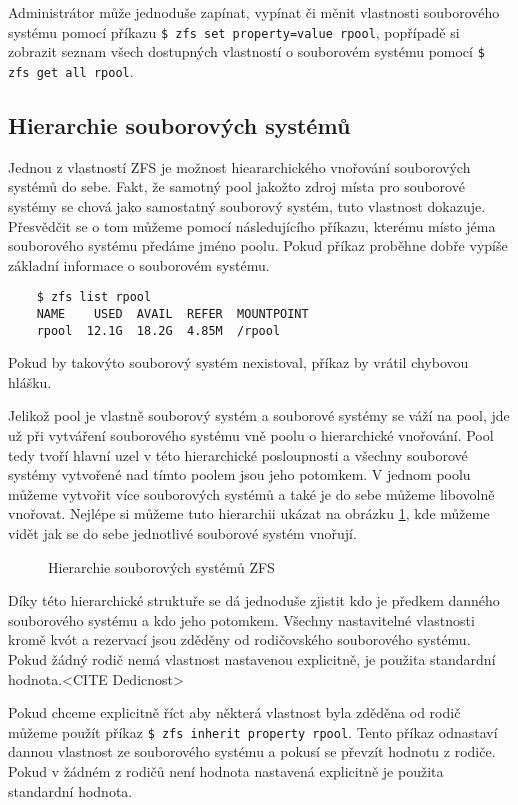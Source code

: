     Administrátor může jednoduše zapínat, vypínat či měnit vlastnosti souborového systému pomocí příkazu \verb|$ zfs set property=value rpool|, popřípadě si zobrazit seznam všech dostupných vlastností o souborovém systému pomocí \verb|$ zfs get all rpool|.

    \subsection{Hierarchie souborových systémů}
    \label{hiararchy}
    Jednou z vlastností ZFS je možnost hieararchického vnořování souborových systémů do sebe. Fakt, že samotný pool jakožto zdroj místa pro souborové systémy se chová jako samostatný souborový systém, tuto vlastnost dokazuje. Přesvědčit se o tom můžeme pomocí následujícího příkazu, kterému místo jéma souborového systému předáme jméno poolu. Pokud příkaz proběhne dobře vypíše základní informace o souborovém systému.
    \begin{verbatim}
    $ zfs list rpool
    NAME    USED  AVAIL  REFER  MOUNTPOINT
    rpool  12.1G  18.2G  4.85M  /rpool
    \end{verbatim}
    Pokud by takovýto souborový systém nexistoval, příkaz by vrátil chybovou hlášku.

    Jelikož pool je vlastně souborový systém a souborové systémy se váží na pool, jde už při vytváření souborového systému vně poolu o hierarchické vnořování. Pool tedy tvoří hlavní uzel v této hierarchické posloupnosti a všechny souborové systémy vytvořené nad tímto poolem jsou jeho potomkem. V jednom poolu můžeme vytvořit více souborových systémů a také je do sebe můžeme libovolně vnořovat. Nejlépe si můžeme tuto hierarchii ukázat na obrázku \ref{fshierarchy}, kde můžeme vidět jak se do sebe jednotlivé souborové systém vnořují.
    \begin{figure}[h]
        \caption{Hierarchie souborových systémů ZFS}
        \label{fshierarchy}
    \end{figure}

    Díky této hierarchické struktuře se dá jednoduše zjistit kdo je předkem danného souborového systému a kdo jeho potomkem. Všechny nastavitelné vlastnosti kromě kvót a rezervací jsou zděděny od rodičovského souborového systému. Pokud žádný rodič nemá vlastnost nastavenou explicitně, je použita standardní hodnota.<CITE Dedicnost>

    Pokud chceme explicitně říct aby některá vlastnost byla zděděna od rodič můžeme použít příkaz \verb|$ zfs inherit property rpool|. Tento příkaz odnastaví dannou vlastnost ze souborového systému a pokusí se převzít hodnotu z rodiče. Pokud v žádném z rodičů není hodnota nastavená explicitně je použita standardní hodnota.
